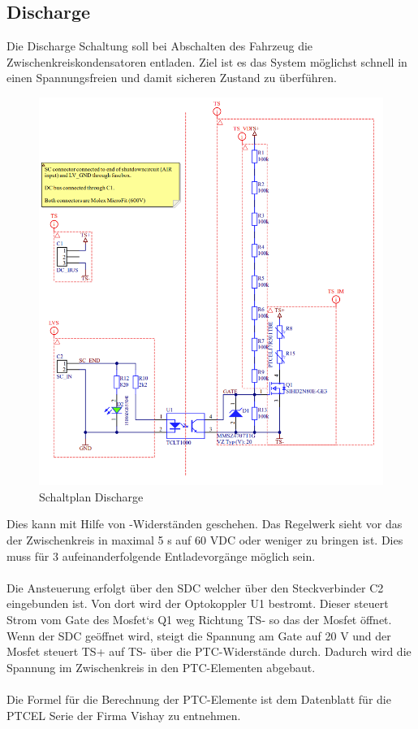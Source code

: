 \subsection{Discharge}
Die Discharge Schaltung soll bei Abschalten des Fahrzeug die Zwischenkreiskondensatoren entladen. Ziel ist es das System möglichst schnell in einen Spannungsfreien und damit sicheren Zustand zu überführen.
\begin{figure}
	\centering
	\includegraphics[width=0.7\linewidth]{bilder/Discharge}
	\caption{Schaltplan Discharge}
	\label{fig:discharge}
\end{figure}

Dies kann mit Hilfe von -Widerständen geschehen. Das Regelwerk sieht vor das der Zwischenkreis in maximal 5 s auf 60 VDC oder weniger zu bringen ist. Dies muss für 3 aufeinanderfolgende Entladevorgänge möglich sein. 
\\
\\
Die Ansteuerung erfolgt über den \ac{SDC} welcher über den Steckverbinder C2 eingebunden ist. Von dort wird der Optokoppler U1 bestromt. Dieser steuert Strom vom Gate des Mosfet`s Q1 weg Richtung \ac{TS}- so das der Mosfet öffnet. Wenn der \ac{SDC} geöffnet wird, steigt die Spannung am Gate auf 20 V und der Mosfet steuert \ac{TS}+ auf \ac{TS}- über die \ac{PTC}-Widerstände durch. Dadurch wird die Spannung im Zwischenkreis in den \ac{PTC}-Elementen abgebaut.
\\
\\
Die Formel für die Berechnung der \ac{PTC}-Elemente ist dem Datenblatt für die PTCEL Serie der Firma Vishay zu entnehmen.

